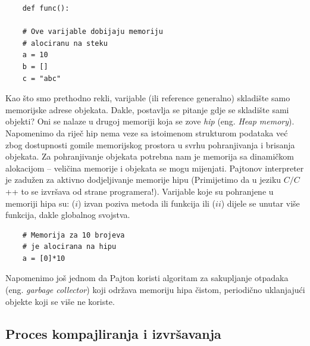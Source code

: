 \begin{verbatim}
	def func():
	
	# Ove varijable dobijaju memoriju 
	# alociranu na steku 
	a = 10
	b = []
	c = "abc"
\end{verbatim}

Kao što smo prethodno rekli, varijable (ili reference generalno) skladište samo memorijske adrese objekata. Dakle, postavlja se pitanje gdje se skladište sami objekti? Oni se nalaze u drugoj memoriji koja se zove \textit{hip} (eng. \textit{Heap memory}). Napomenimo da riječ hip nema veze sa istoimenom strukturom podataka  već  zbog dostupnosti gomile memorijskog prostora u svrhu pohranjivanja i brisanja objekata.   Za pohranjivanje objekata potrebna nam je memorija sa dinamičkom alokacijom  -- veličina memorije i objekata se mogu mijenjati. Pajtonov interpreter je zadužen za aktivno dodjeljivanje memorije hipu (Primijetimo da u jeziku $C/C$++ to  se izvršava od strane programera!). Varijable koje su pohranjene u memoriji hipa su: ($i$)   izvan poziva metoda ili funkcija ili ($ii$) dijele se unutar više funkcija, dakle globalnog svojstva.

\begin{verbatim}
	# Memorija za 10 brojeva
	# je alocirana na hipu
	a = [0]*10     
\end{verbatim}


Napomenimo još jednom da Pajton koristi algoritam za sakupljanje otpadaka (eng. \textit{garbage collector}) koji održava memoriju hipa čistom, periodično uklanjajući  objekte koji se više ne koriste.




\subsection{Proces kompajliranja i izvršavanja}

